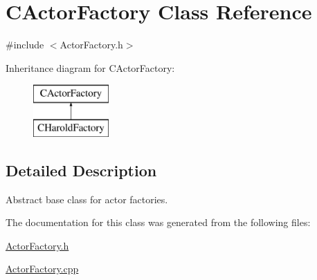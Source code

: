 \hypertarget{class_c_actor_factory}{}\section{C\+Actor\+Factory Class Reference}
\label{class_c_actor_factory}


{\ttfamily \#include $<$Actor\+Factory.\+h$>$}

Inheritance diagram for C\+Actor\+Factory\+:\begin{figure}[H]
\begin{center}
\leavevmode
\includegraphics[height=2.000000cm]{class_c_actor_factory}
\end{center}
\end{figure}


\subsection{Detailed Description}
Abstract base class for actor factories. 

The documentation for this class was generated from the following files\+:\begin{DoxyCompactItemize}
\item 
\hyperlink{_actor_factory_8h}{Actor\+Factory.\+h}\item 
\hyperlink{_actor_factory_8cpp}{Actor\+Factory.\+cpp}\end{DoxyCompactItemize}
